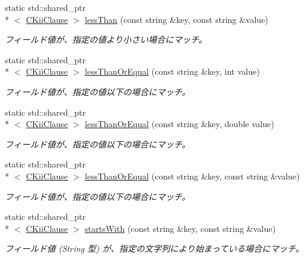 \begin{DoxyCompactItemize}
static std\-::shared\-\_\-ptr\\*
$<$ \hyperlink{class_c_kii_clause}{C\-Kii\-Clause} $>$ \hyperlink{class_c_kii_clause_a80f180f1d69c2e99a59060ad5baaa4fa}{less\-Than} (const string \&key, const string \&value)
\begin{DoxyCompactList}\small\item\em フィールド値が、指定の値より小さい場合にマッチ。 \end{DoxyCompactList}\item 
static std\-::shared\-\_\-ptr\\*
$<$ \hyperlink{class_c_kii_clause}{C\-Kii\-Clause} $>$ \hyperlink{class_c_kii_clause_aac4fe1a687424ffd518d8ac4938b07e9}{less\-Than\-Or\-Equal} (const string \&key, int value)
\begin{DoxyCompactList}\small\item\em フィールド値が、指定の値以下の場合にマッチ。 \end{DoxyCompactList}\item 
static std\-::shared\-\_\-ptr\\*
$<$ \hyperlink{class_c_kii_clause}{C\-Kii\-Clause} $>$ \hyperlink{class_c_kii_clause_aa1112eff242879f56e8ff01a2d2a0158}{less\-Than\-Or\-Equal} (const string \&key, double value)
\begin{DoxyCompactList}\small\item\em フィールド値が、指定の値以下の場合にマッチ。 \end{DoxyCompactList}\item 
static std\-::shared\-\_\-ptr\\*
$<$ \hyperlink{class_c_kii_clause}{C\-Kii\-Clause} $>$ \hyperlink{class_c_kii_clause_ac261d6021b7c3bc7e3b872cbd15f7e87}{less\-Than\-Or\-Equal} (const string \&key, const string \&value)
\begin{DoxyCompactList}\small\item\em フィールド値が、指定の値以下の場合にマッチ。 \end{DoxyCompactList}\item 
static std\-::shared\-\_\-ptr\\*
$<$ \hyperlink{class_c_kii_clause}{C\-Kii\-Clause} $>$ \hyperlink{class_c_kii_clause_aa8ffe90a53af7db170cc0861847e681f}{starts\-With} (const string \&key, const string \&value)
\begin{DoxyCompactList}\small\item\em フィールド値 (String 型) が、指定の文字列により始まっている場合にマッチ。 \end{DoxyCompactList}\item 

\end{DoxyCompactItemize}
